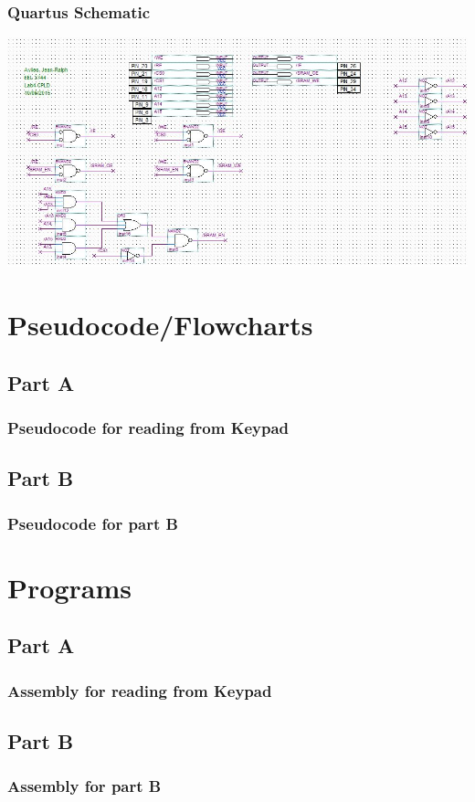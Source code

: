 \documentclass[letterpaper, 12pt]{article}
\begin{document}
\subsubsection*{Quartus Schematic}
\begin{center}
  \includegraphics[scale=0.5]{lab4}
\end{center}
\section*{Pseudocode/Flowcharts}
\subsection*{Part A}
\subsubsection*{Pseudocode for reading from Keypad}
  
\subsection*{Part B}
\subsubsection*{Pseudocode for part B}
  
\section*{Programs}
\subsection*{Part A}
\subsubsection*{Assembly for reading from Keypad}
  
\subsection*{Part B}
\subsubsection*{Assembly for part B}
  
\end{document}

